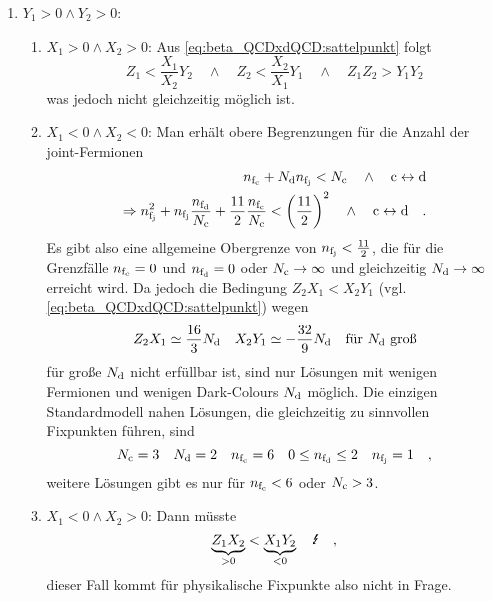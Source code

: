       \begin{enumerate}
       \item $Y_1 > 0 \land Y_2 > 0$:
	 \begin{enumerate}
	  \item $X_1>0 \land X_2 >0$: Aus  
	  \eqref{eq:beta_QCDxdQCD:sattelpunkt} folgt 
	  \begin{equation}
	  Z_1<\frac{X_1}{X_2} Y_2 \quad \land \quad Z_2 < \frac{X_2}{X_1} Y_1
	  \quad\land\quad Z_1 Z_2 > Y_1 Y_2
	  \end{equation}
	  was jedoch nicht gleichzeitig möglich ist.
	 \item $X_1<0 \land X_2<0$: \label{Fall1b}
	  Man erhält obere Begrenzungen für die Anzahl der joint-Fermionen 
	  \begin{align}
	   n_{\text{f}_\text{c}}+N_\text{d} n_{\text{f}_\text{j}} < N_\text{c} \quad\land\quad \text{c} \leftrightarrow\text{d}
	   \\\Rightarrow
	   n_{\text{f}_\text{j}}^2 + n_{\text{f}_\text{j}}\frac{n_{\text{f}_\text{d}}}{N_\text{c}}+\frac{11}{2}\frac{n_{\text{f}_\text{c}}}{N_\text{c}} < 
	   \left( \frac{11}{2}\right)^2
	    \quad\land\quad \text{c} \leftrightarrow\text{d} \quad .
	    \label{eq:beta_QCDxdQCD:Sattelpunkt1b}
	  \end{align}
	  Es gibt also eine allgemeine Obergrenze von $n_{\text{f}_\text{j}}<\frac{11}{2}$, 
	  die für die Grenzfälle $n_{\text{f}_\text{c}}=0$ und $n_{\text{f}_\text{d}}=0$ oder $N_\text{c}\to\infty$
	  und gleichzeitig $N_\text{d} \to \infty$ erreicht wird. Da jedoch die 
	  Bedingung $Z_2X_1<X_2Y_1$ (vgl. \eqref{eq:beta_QCDxdQCD:sattelpunkt}) 
	  wegen 
	  \begin{equation}
	   Z_2 X_1 \simeq \frac{16}{3} N_\text{d} \quad X_2Y_1 \simeq -\frac{32}{9} N_\text{d} 
	   \quad \text{für $N_\text{d}$ groß}
	  \end{equation}
	  für große $N_\text{d}$ nicht erfüllbar ist, sind nur Lösungen mit wenigen 
	  Fermionen und wenigen Dark-Colours $N_\text{d}$ möglich.
	  Die einzigen Standardmodell nahen Lösungen, die gleichzeitig zu 
	  sinnvollen Fixpunkten führen, sind
	  \begin{equation}
	   N_\text{c}=3 \quad N_\text{d} = 2 \quad n_{\text{f}_\text{c}} =6 \quad 0\leq n_{\text{f}_\text{d}} \leq 2 \quad 
	   n_{\text{f}_\text{j}} =1 \quad ,
	  \end{equation}
	  weitere Lösungen gibt es nur für $n_{\text{f}_\text{c}}<6$ oder $N_\text{c}>3$.
	 \item $X_1<0 \land X_2 >0$:
	  Dann müsste
	  \begin{equation}
	   \underbrace{Z_1 X_2}_{>0} < \underbrace{X_1 Y_2}_{<0} \quad 
	   \blitz \quad ,
	  \end{equation}
	  dieser Fall kommt für physikalische Fixpunkte also nicht in Frage.
	 \end{enumerate}

\end{enumerate}
